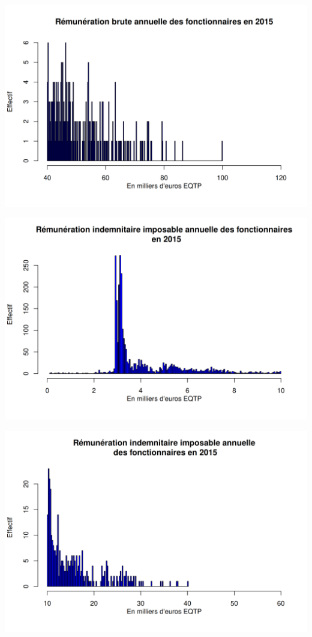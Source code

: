 \includegraphics{altair_files/figure-latex/unnamed-chunk-43-2.png}

\includegraphics{altair_files/figure-latex/unnamed-chunk-43-3.png}

\includegraphics{altair_files/figure-latex/unnamed-chunk-43-4.png}


